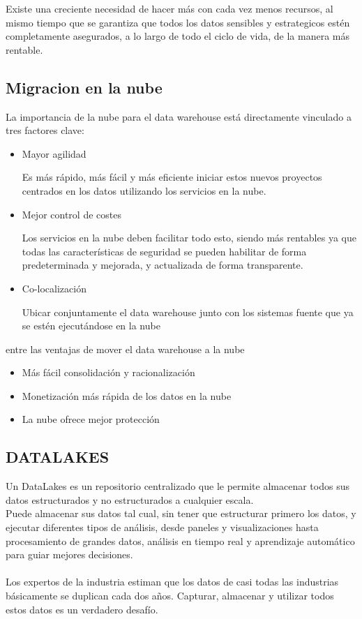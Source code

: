 \documentclass[%
 reprint,
 amsmath,amssymb,
 aps,
]{revtex4-1}
\begin{document}
Existe una creciente necesidad de hacer más con cada vez menos recursos, al mismo tiempo que se garantiza que todos los datos sensibles y estrategicos estén completamente asegurados, a lo largo de todo el ciclo de vida, de la manera más rentable.\cite{robles1}
	

\subsection{Migracion en la nube}

La importancia de la nube para el data warehouse está directamente vinculado a tres factores clave:

\begin{itemize}
	\item Mayor agilidad

Es más rápido, más fácil y más eficiente iniciar estos nuevos proyectos centrados en los datos utilizando los servicios en la nube.

	\item Mejor control de costes

Los servicios en la nube deben facilitar todo esto, siendo más rentables ya que todas las características de seguridad se pueden habilitar de forma predeterminada y mejorada, y actualizada de forma transparente.

	\item Co-localización

Ubicar conjuntamente el data warehouse junto con los sistemas fuente que ya se estén ejecutándose en la nube
\end{itemize}

entre las ventajas de mover el data warehouse a la nube

\begin{itemize}
	\item Más fácil consolidación y racionalización
	\item Monetización más rápida de los datos en la nube
	\item La nube ofrece mejor protección
\end{itemize}

\subsection{DATALAKES}	

Un DataLakes es un repositorio centralizado que le permite almacenar todos sus datos estructurados y no estructurados a cualquier escala. 
\\ Puede almacenar sus datos tal cual, sin tener que estructurar primero los datos, y ejecutar diferentes tipos de análisis, desde paneles y visualizaciones hasta procesamiento de grandes datos, análisis en tiempo real y aprendizaje automático para guiar mejores decisiones.
\\\\
Los expertos de la industria estiman que los datos de casi todas las industrias básicamente se duplican cada dos años. Capturar, almacenar y utilizar todos estos datos es un verdadero desafío. \\
\end{document}
